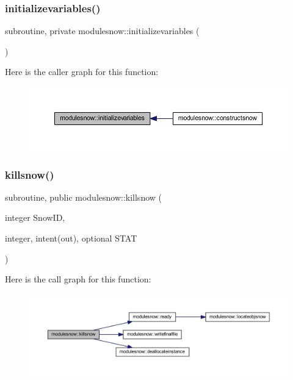 \subsubsection{\texorpdfstring{initializevariables()}{initializevariables()}}
{\footnotesize\ttfamily subroutine, private modulesnow\+::initializevariables (\begin{DoxyParamCaption}{ }\end{DoxyParamCaption})\hspace{0.3cm}{\ttfamily [private]}}

Here is the caller graph for this function\+:\nopagebreak
\begin{figure}[H]
\begin{center}
\leavevmode
\includegraphics[width=350pt]{namespacemodulesnow_a9e1c37918173cd2c259cbdae24b7e9bc_icgraph}
\end{center}
\end{figure}
\mbox{\label{namespacemodulesnow_abd86d0a2403e7608f089a4ee16dab4e6}} 
\subsubsection{\texorpdfstring{killsnow()}{killsnow()}}
{\footnotesize\ttfamily subroutine, public modulesnow\+::killsnow (\begin{DoxyParamCaption}\item[{integer}]{Snow\+ID,  }\item[{integer, intent(out), optional}]{S\+T\+AT }\end{DoxyParamCaption})}

Here is the call graph for this function\+:\nopagebreak
\begin{figure}[H]
\begin{center}
\leavevmode
\includegraphics[width=350pt]{namespacemodulesnow_abd86d0a2403e7608f089a4ee16dab4e6_cgraph}
\end{center}
\end{figure}
\mbox{\label{namespacemodulesnow_abd7d9e3dda07461c69e66347c0a3d904}} 
